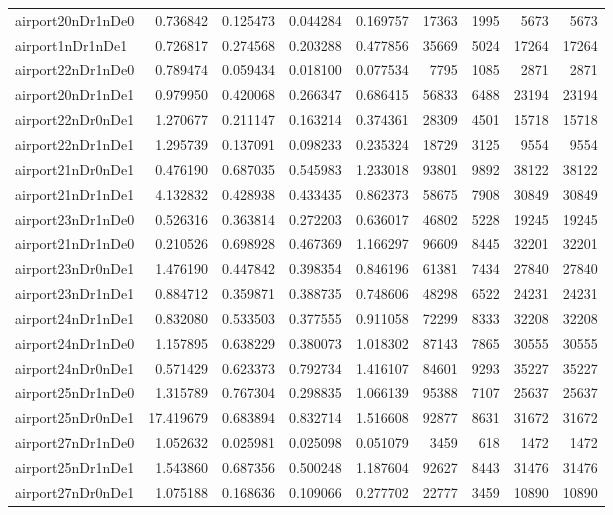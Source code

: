 \begin{longtable}{|l|r|r|r|r|r|r|r|r|}
airport20nDr1nDe0 & 0.736842 & 0.125473 & 0.044284 & 0.169757 & 17363 & 1995 & 5673 & 5673 \\
airport1nDr1nDe1 & 0.726817 & 0.274568 & 0.203288 & 0.477856 & 35669 & 5024 & 17264 & 17264 \\
airport22nDr1nDe0 & 0.789474 & 0.059434 & 0.018100 & 0.077534 & 7795 & 1085 & 2871 & 2871 \\
airport20nDr1nDe1 & 0.979950 & 0.420068 & 0.266347 & 0.686415 & 56833 & 6488 & 23194 & 23194 \\
airport22nDr0nDe1 & 1.270677 & 0.211147 & 0.163214 & 0.374361 & 28309 & 4501 & 15718 & 15718 \\
airport22nDr1nDe1 & 1.295739 & 0.137091 & 0.098233 & 0.235324 & 18729 & 3125 & 9554 & 9554 \\
airport21nDr0nDe1 & 0.476190 & 0.687035 & 0.545983 & 1.233018 & 93801 & 9892 & 38122 & 38122 \\
airport21nDr1nDe1 & 4.132832 & 0.428938 & 0.433435 & 0.862373 & 58675 & 7908 & 30849 & 30849 \\
airport23nDr1nDe0 & 0.526316 & 0.363814 & 0.272203 & 0.636017 & 46802 & 5228 & 19245 & 19245 \\
airport21nDr1nDe0 & 0.210526 & 0.698928 & 0.467369 & 1.166297 & 96609 & 8445 & 32201 & 32201 \\
airport23nDr0nDe1 & 1.476190 & 0.447842 & 0.398354 & 0.846196 & 61381 & 7434 & 27840 & 27840 \\
airport23nDr1nDe1 & 0.884712 & 0.359871 & 0.388735 & 0.748606 & 48298 & 6522 & 24231 & 24231 \\
airport24nDr1nDe1 & 0.832080 & 0.533503 & 0.377555 & 0.911058 & 72299 & 8333 & 32208 & 32208 \\
airport24nDr1nDe0 & 1.157895 & 0.638229 & 0.380073 & 1.018302 & 87143 & 7865 & 30555 & 30555 \\
airport24nDr0nDe1 & 0.571429 & 0.623373 & 0.792734 & 1.416107 & 84601 & 9293 & 35227 & 35227 \\
airport25nDr1nDe0 & 1.315789 & 0.767304 & 0.298835 & 1.066139 & 95388 & 7107 & 25637 & 25637 \\
airport25nDr0nDe1 & 17.419679 & 0.683894 & 0.832714 & 1.516608 & 92877 & 8631 & 31672 & 31672 \\
airport27nDr1nDe0 & 1.052632 & 0.025981 & 0.025098 & 0.051079 & 3459 & 618 & 1472 & 1472 \\
airport25nDr1nDe1 & 1.543860 & 0.687356 & 0.500248 & 1.187604 & 92627 & 8443 & 31476 & 31476 \\
airport27nDr0nDe1 & 1.075188 & 0.168636 & 0.109066 & 0.277702 & 22777 & 3459 & 10890 & 10890 \\

\end{longtable}
